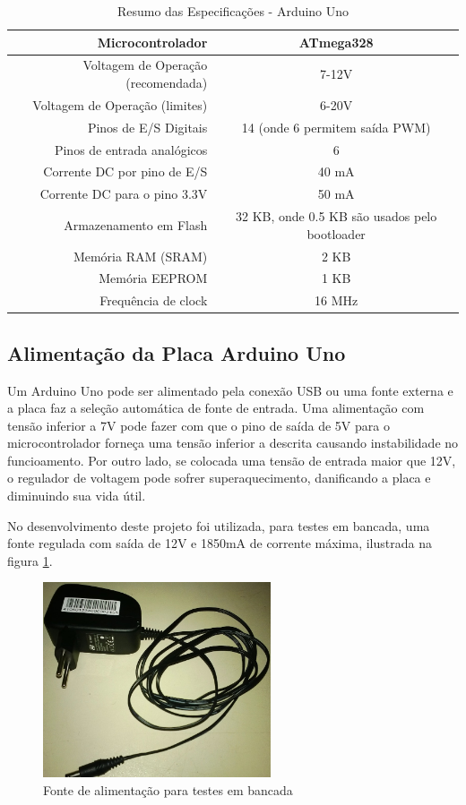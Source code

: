 \begin{table}[!h]
\caption{Resumo das Especificações - Arduino Uno}
	\begin{tabular}{|r|c|}
		\hline
			Microcontrolador & ATmega328
		\\
		\hline
			Voltagem de Operação (recomendada) & 7-12V
		\\
		\hline
			Voltagem de Operação (limites) & 6-20V
		\\
		\hline
			Pinos de E/S Digitais & 14 (onde 6 permitem saída PWM)
		\\
		\hline
			Pinos de entrada analógicos & 6
		\\
		\hline
			Corrente DC por pino de E/S & 40 mA
		\\
		\hline
			Corrente DC para o pino 3.3V & 50 mA
		\\
		\hline
			Armazenamento em Flash & 32 KB, onde 0.5 KB são usados pelo bootloader
		\\
		\hline
			Memória RAM (SRAM) & 2 KB
		\\
		\hline
			Memória EEPROM & 1 KB
		\\
		\hline
			Frequência de clock & 16 MHz
		\\
\hline
\end{tabular}
\end{table}

\subsection{Alimentação da Placa Arduino Uno}

Um Arduino Uno pode ser alimentado pela conexão USB ou uma fonte externa e a placa faz a seleção automática de fonte de entrada. Uma alimentação com tensão inferior a 7V pode fazer com que o pino de saída de 5V para o microcontrolador forneça uma tensão inferior a descrita causando instabilidade no funcioamento. Por outro lado, se colocada uma tensão de entrada maior que 12V, o regulador de voltagem pode sofrer superaquecimento, danificando a placa e diminuindo sua vida útil.

No desenvolvimento deste projeto foi utilizada, para testes em bancada, uma fonte regulada com saída de 12V e 1850mA de corrente máxima, ilustrada na figura \ref{fig:fontedc}.

\begin{figure}[h!]
			\centering
			\includegraphics[width=0.6\textwidth]{figures/fonteAlim.jpg}
			\caption{Fonte de alimentação para testes em bancada}
			\label{fig:fontedc}
\end{figure}

